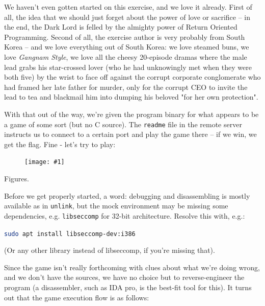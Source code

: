 \documentclass{article}
\newcommand{\displayimage}[1] {
\begin{figure}[H]
    \centering
    \texttt{[image: \#1]} 
\end{figure}
}
\newcommand{\xcode}[2]{\colorbox{ubuntuback}{\lstinline[language=#1]|#2|}}
\newcommand{\code}[1]{\colorbox{ubuntuback}{\texttt{#1}}}
\begin{document}
We haven't even gotten started on this exercise, and we love it already. First of all, the idea that we should just forget about the power of love or sacrifice -- in the end, the Dark Lord is felled by the almighty power of Return Oriented Programming. Second of all, the exercise author is very probably from South Korea -- and we love everything out of South Korea: we love steamed buns, we love \textit{Gangnam Style}, we love all the cheesy 20-episode dramas where the male lead grabs his star-crossed lover (who he had unknowingly met when they were both five) by the wrist to face off against the corrupt corporate conglomerate who had framed her late father for murder, only for the corrupt CEO to invite the lead to tea and blackmail him into dumping his beloved "for her own protection".

With that out of the way, we're given the program binary for what appears to be a game of some sort (but no C source). The \xcode{bash}{readme} file in the remote server instructs us to connect to a certain port and play the game there -- if we win, we get the flag. Fine - let's try to play:

\displayimage{./exercises/20_horcruxes/normal_play.png}

Figures. 

Before we get properly started, a word: debugging and disassembling is mostly available as in \code{unlink}, but the mock environment may be missing some dependencies, e.g. \code{libseccomp} for 32-bit architecture. Resolve this with, e.g.:

\xcode{bash}{sudo apt install libseccomp-dev:i386}

(Or any other library instead of libseccomp, if you're missing that).

Since the game isn't really forthcoming with clues about what we're doing wrong, and we don't have the sources, we have no choice but to reverse-engineer the program (a disassembler, such as IDA pro, is the best-fit tool for this). It turns out that the game execution flow is as follows:
\end{document}
